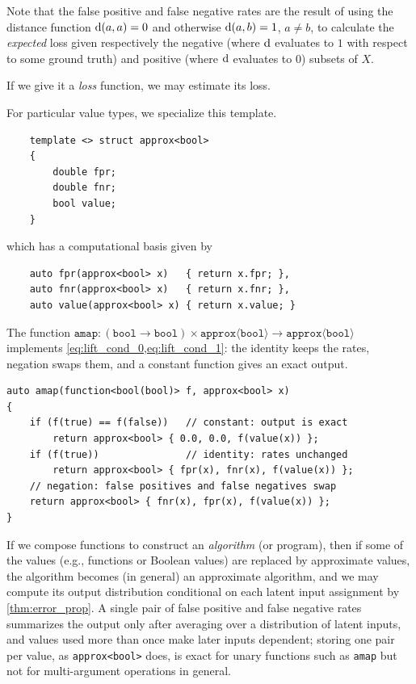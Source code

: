 \documentclass[ ../main.tex]{subfiles}
\begin{document}
Note that the false positive and false negative rates are the result of using the distance function $\Fun{d}(a,a) = 0$ and otherwise $\Fun{d}(a,b) = 1$, $a \neq b$, to calculate the \emph{expected} loss given respectively the negative (where $\Fun{d}$ evaluates to $1$ with respect to some ground truth) and positive (where $\Fun{d}$ evaluates to $0$) subsets of $X$.

If we give it a \emph{loss} function, we may estimate its loss.


For particular value types, we specialize this template.
\begin{verbatim}
	template <> struct approx<bool>
	{
		double fpr;
		double fnr;
		bool value;
	}
\end{verbatim}
which has a computational basis given by
\begin{verbatim}
	auto fpr(approx<bool> x)   { return x.fpr; },
	auto fnr(approx<bool> x)   { return x.fnr; },
	auto value(approx<bool> x) { return x.value; }
\end{verbatim}

The function $\mathtt{amap} \colon (\mathtt{bool} \to \mathtt{bool}) \times \mathtt{approx}\langle\mathtt{bool}\rangle \to \mathtt{approx}\langle\mathtt{bool}\rangle$ implements \cref{eq:lift_cond_0,eq:lift_cond_1}: the identity keeps the rates, negation swaps them, and a constant function gives an exact output.
\begin{verbatim}
auto amap(function<bool(bool)> f, approx<bool> x)
{
	if (f(true) == f(false))   // constant: output is exact
		return approx<bool> { 0.0, 0.0, f(value(x)) };
	if (f(true))               // identity: rates unchanged
		return approx<bool> { fpr(x), fnr(x), f(value(x)) };
	// negation: false positives and false negatives swap
	return approx<bool> { fnr(x), fpr(x), f(value(x)) };
}
\end{verbatim}

If we compose functions to construct an \emph{algorithm} (or program), then if some of the values (e.g., functions or Boolean values) are replaced by approximate values, the algorithm becomes (in general) an approximate algorithm, and we may compute its output distribution conditional on each latent input assignment by \cref{thm:error_prop}.
A single pair of false positive and false negative rates summarizes the output only after averaging over a distribution of latent inputs, and values used more than once make later inputs dependent; storing one pair per value, as \texttt{approx<bool>} does, is exact for unary functions such as \texttt{amap} but not for multi-argument operations in general.
\end{document}
